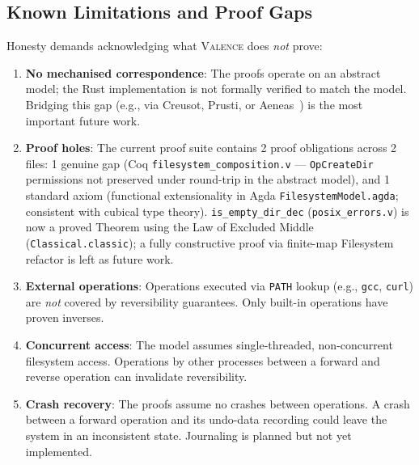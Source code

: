 \documentclass[11pt,a4paper]{article}
\newcommand{\valence}{\textsc{Valence}}
\begin{document}
\subsection{Known Limitations and Proof Gaps}

Honesty demands acknowledging what \valence{} does \emph{not} prove:

\begin{enumerate}
  \item \textbf{No mechanised correspondence}: The proofs operate on an
        abstract model; the Rust implementation is not formally verified to
        match the model. Bridging this gap (e.g., via Creusot, Prusti, or
        Aeneas~\citep{ho2022}) is the most important future work.

  \item \textbf{Proof holes}: The current proof suite contains 2 proof
        obligations across 2 files: 1 genuine gap (Coq \texttt{filesystem\_composition.v}
        — \texttt{OpCreateDir} permissions not preserved under round-trip in the
        abstract model), and 1 standard axiom (functional extensionality in Agda
        \texttt{FilesystemModel.agda}; consistent with cubical type theory).
        \texttt{is\_empty\_dir\_dec} (\texttt{posix\_errors.v}) is now a proved
        Theorem using the Law of Excluded Middle (\texttt{Classical.classic}); a
        fully constructive proof via finite-map Filesystem refactor is left as
        future work.

  \item \textbf{External operations}: Operations executed via
        \texttt{PATH} lookup (e.g., \texttt{gcc}, \texttt{curl}) are
        \emph{not} covered by reversibility guarantees. Only built-in
        operations have proven inverses.

  \item \textbf{Concurrent access}: The model assumes single-threaded,
        non-concurrent filesystem access. Operations by other processes between
        a forward and reverse operation can invalidate reversibility.

  \item \textbf{Crash recovery}: The proofs assume no crashes between
        operations. A crash between a forward operation and its undo-data
        recording could leave the system in an inconsistent state. Journaling
        is planned but not yet implemented.
\end{enumerate}

\end{document}
